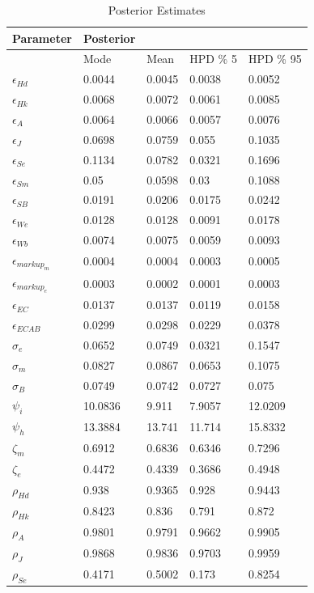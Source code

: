 \documentclass[12pt]{article}
\numberwithin{equation}{section}
\begin{document}
\begin{table}[H]
\caption{Posterior Estimates}
\begin{tabular}{l||llll}
Parameter & Posterior &  &  &  \\
\hline
\hline
 & Mode & Mean & HPD \% 5 & HPD \% 95 \\
$\epsilon_{Hd}$ & 0.0044 & 0.0045 & 0.0038 & 0.0052 \\
$\epsilon_{Hk}$ & 0.0068 & 0.0072 & 0.0061 & 0.0085 \\
$\epsilon_{A}$ & 0.0064 & 0.0066 & 0.0057 & 0.0076 \\
$\epsilon_{J}$ & 0.0698 & 0.0759 & 0.055 & 0.1035 \\
$\epsilon_{Se}$ & 0.1134 & 0.0782 & 0.0321 & 0.1696 \\
$\epsilon_{Sm}$ & 0.05 & 0.0598 & 0.03 & 0.1088 \\
$\epsilon_{SB}$ & 0.0191 & 0.0206 & 0.0175 & 0.0242 \\
$\epsilon_{We}$ & 0.0128 & 0.0128 & 0.0091 & 0.0178 \\
$\epsilon_{Wb}$ & 0.0074 & 0.0075 & 0.0059 & 0.0093 \\
$\epsilon_{markup_m}$ & 0.0004 & 0.0004 & 0.0003 & 0.0005 \\
$\epsilon_{markup_e}$ & 0.0003 & 0.0002 & 0.0001 & 0.0003 \\
$\epsilon_{EC}$ & 0.0137 & 0.0137 & 0.0119 & 0.0158 \\
$\epsilon_{ECAB}$ & 0.0299 & 0.0298 & 0.0229 & 0.0378 \\
$\sigma_e$ & 0.0652 & 0.0749 & 0.0321 & 0.1547 \\
$\sigma_m$ & 0.0827 & 0.0867 & 0.0653 & 0.1075 \\
$\sigma_B$ & 0.0749 & 0.0742 & 0.0727 & 0.075 \\
$\psi_i$ & 10.0836 & 9.911 & 7.9057 & 12.0209 \\
$\psi_h$ & 13.3884 & 13.741 & 11.714 & 15.8332 \\
$\zeta_m$ & 0.6912 & 0.6836 & 0.6346 & 0.7296 \\
$\zeta_e$ & 0.4472 & 0.4339 & 0.3686 & 0.4948 \\
$\rho_{Hd}$ & 0.938 & 0.9365 & 0.928 & 0.9443 \\
$\rho_{Hk}$ & 0.8423 & 0.836 & 0.791 & 0.872 \\
$\rho_{A}$ & 0.9801 & 0.9791 & 0.9662 & 0.9905 \\
$\rho_{J}$ & 0.9868 & 0.9836 & 0.9703 & 0.9959 \\
$\rho_{Se}$ & 0.4171 & 0.5002 & 0.173 & 0.8254 \\

\end{tabular}
\end{table}
\end{document}
